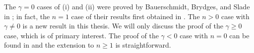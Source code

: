 The $\gamma = 0$ cases of (i) and (ii) were proved by Bauerschmidt, Brydges,
and Slade in \cite{BBS-saw4,BBS-saw4-log};
in fact, the $n = 1$ case of their results  first obtained in
\cite{Hara87,HT87,GK85,FMRS87}.
The $n > 0$ case with $\gamma \ne 0$ is a new result in this thesis. We
will only discuss the proof of the $\gamma \ge 0$ case, which is of primary
interest. The proof of the $\gamma < 0$ case with $n = 0$ can be found in
\cite{BSW-saw-sa} and the extension to $n \ge 1$ is straightforward.